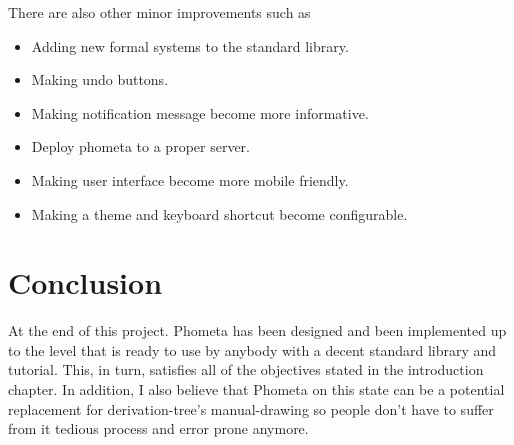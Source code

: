 \documentclass[master.tex]{subfiles}
\begin{document}
There are also other minor improvements such as
\begin{itemize}
\item Adding new formal systems to the standard library.
\item Making undo buttons.
\item Making notification message become more informative.
\item Deploy phometa to a proper server.
\item Making user interface become more mobile friendly.
\item Making a theme and keyboard shortcut become configurable.
\end{itemize}

\section{Conclusion}

At the end of this project. Phometa has been designed and been implemented up to
the level that is ready to use by anybody with a decent standard library and
tutorial. This, in turn, satisfies all of the objectives stated in the
introduction chapter. In addition, I also believe that Phometa on this state can
be a potential replacement for derivation-tree's manual-drawing so people don't
have to suffer from it tedious process and error prone anymore.
\end{document}
